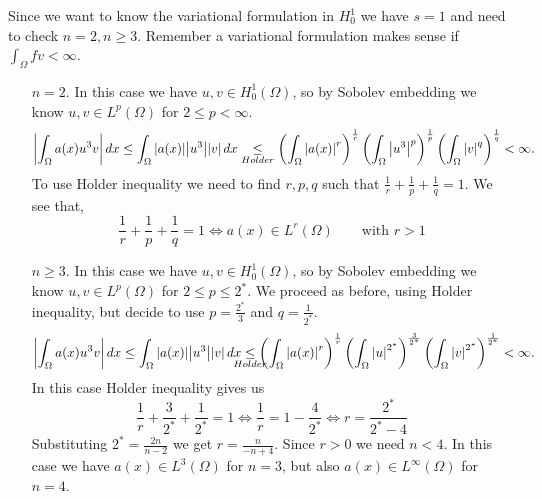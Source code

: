     Since we want to know the variational formulation in \(H^1_0\) we have \(s = 1\) and need to check \(n = 2, n \geq 3\). Remember a variational formulation makes sense if \(\int_\Omega fv < \infty\).
    \begin{itemize}
        \item[\(n = 2\).] In this case we have \(u, v \in H^1_0(\Omega)\), so by Sobolev embedding we know \(u, v \in L^p(\Omega)\) for \(2 \leq p < \infty\). 
        \[
            \abs{\int_\Omega a(x) u^3 v}  \, dx \leq \int_\Omega \abs{a(x)} \abs{u^3} \abs{v} \, dx \underset{Holder}{\leq} \left(\int_\Omega \abs{a(x)}^r\right)^{\frac{1}{r}} \left(\int_\Omega \abs{u^3}^p \right)^{\frac{1}{p}} \left(\int_\Omega \abs{v}^q \right)^{\frac{1}{q}} < \infty.
        \]
        To use Holder inequality we need to find \(r, p, q\) such that \(\frac{1}{r} + \frac{1}{p} + \frac{1}{q} = 1\). We see that, 
        \[
            \frac{1}{r} + \frac{1}{p} + \frac{1}{q} = 1 \iff a(x) \in L^r(\Omega) \qquad \text{with } r > 1
        \]
        \item[\(n \geq 3\).] In this case we have \(u, v \in H^1_0(\Omega)\), so by Sobolev embedding we know \(u, v \in L^p(\Omega)\) for \(2 \leq p \leq 2^*\).
        We proceed as before, using Holder inequality, but decide to use \(p = \frac{2^*}{3}\) and \(q = \frac{1}{2^*}.\)
        \[
            \abs{\int_\Omega a(x) u^3 v}  \, dx \leq \int_\Omega \abs{a(x)} \abs{u^3} \abs{v} \, dx \underset{\mathclap{Holder}}{\leq} \left(\int_\Omega \abs{a(x)}^r\right)^{\frac{1}{r}} \left(\int_\Omega \abs{u}^{2^*} \right)^{\frac{3}{2^*}} \left(\int_\Omega \abs{v}^{2^*} \right)^{\frac{1}{2^*}} < \infty.
        \]
        In this case Holder inequality gives us 
        \[
            \frac{1}{r} + \frac{3}{2^*} + \frac{1}{2^*} = 1 \iff \frac{1}{r} = 1 - \frac{4}{2^*} \iff r = \frac{2^*}{2^* - 4}
        \]
        Substituting \(2^* = \frac{2n}{n - 2}\) we get \(r = \frac{n}{-n + 4}\). Since \(r > 0\) we need \(n < 4\).
        In this case we have \(a(x) \in L^3(\Omega)\) for \(n = 3\), but also \(a(x) \in L^\infty(\Omega)\) for \(n = 4\).
    \end{itemize}
    

